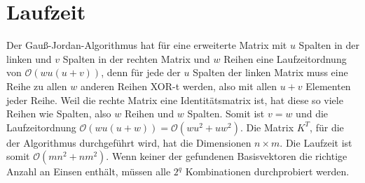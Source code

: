 \documentclass[a4paper,10pt,ngerman]{scrartcl}
\begin{document}
\section{Laufzeit}
Der Gauß-Jordan-Algorithmus hat für eine erweiterte Matrix mit $u$ Spalten in der linken und $v$ Spalten in der rechten Matrix und $w$ Reihen eine Laufzeitordnung von $\mathcal{O}(wu(u+v))$, denn für jede der $u$ Spalten der linken Matrix muss eine Reihe zu allen $w$ anderen Reihen XOR-t werden, also mit allen $u+v$ Elementen jeder Reihe. Weil die rechte Matrix eine Identitätsmatrix ist, hat diese so viele Reihen wie Spalten, also $w$ Reihen und $w$ Spalten. Somit ist $v=w$ und die Laufzeitordnung $\mathcal{O}(wu(u+w))=\mathcal{O}(wu^2+uw^2)$. Die Matrix $K^T$, für die der Algorithmus durchgeführt wird, hat die Dimensionen $n \times m$. Die Laufzeit ist somit $\mathcal{O}(mn^2+nm^2)$. Wenn keiner der gefundenen Basisvektoren die richtige Anzahl an Einsen enthält, müssen alle $2^q$ Kombinationen durchprobiert werden.
\end{document}
